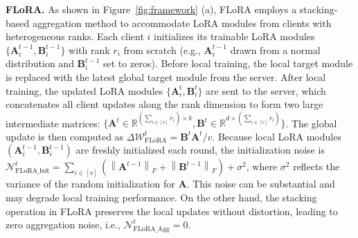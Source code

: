 \documentclass{article} %
\newcommand{\Init}{\mathsf{Init}}
\newcommand{\supplement}[1]{\textit{#1}}
\begin{document}






\textbf{FLoRA.} As shown in Figure~\ref{fig:framework} (a), FLoRA employs a stacking-based aggregation method to accommodate LoRA modules from clients with heterogeneous ranks. Each client $i$ initializes its trainable LoRA modules $\{\mathbf{A}_i^{t-1}, \mathbf{B}_i^{t-1}\}$ with rank $r_i$ from scratch (e.g., $\mathbf{A}_i^{t-1}$ drawn from a normal distribution and $\mathbf{B}_i^{t-1}$ set to zeros). Before local training, the local target module is replaced with the latest global target module from the server. After local training, the updated LoRA modules $\{\mathbf{A}_i^t, \mathbf{B}_i^t\}$ are sent to the server, which concatenates all client updates along the rank dimension to form two large intermediate matrices: $\{\mathbf{A}^t\in\mathbb{R}^{(\sum_{i\in[v]}r_i)\times k},\mathbf{B}^t \in\mathbb{R}^{d\times (\sum_{i\in[v]}r_i)}\}$. The global update is then computed as $\Delta\boldsymbol{\mathcal{W}}_{\text{FLoRA}}^t = \mathbf{B}^t \mathbf{A}^t / v$. Because local LoRA modules $(\mathbf{A}_i^{t-1}, \mathbf{B}_i^{t-1})$ are freshly initialized each round, the initialization noise is $\mathcal{N}_{\text{FLoRA\_}\Init}^{t} = \sum_{i\in[v]} \left( \left\|{\mathbf{A}}^{t-1} \right\|_F+\left\|{\mathbf{B}}^{t-1} \right\|_F  \right) + \sigma^2$, where $\sigma^2$ reflects the variance of the random initialization for $\mathbf{A}$. This noise can be substantial and may degrade local training performance. On the other hand, the stacking operation in FLoRA preserves the local updates without distortion, leading to zero aggregation noise, i.e., $\mathcal{N}_{\text{FLoRA\_Agg}}^{t} = 0$. 
\end{document}
